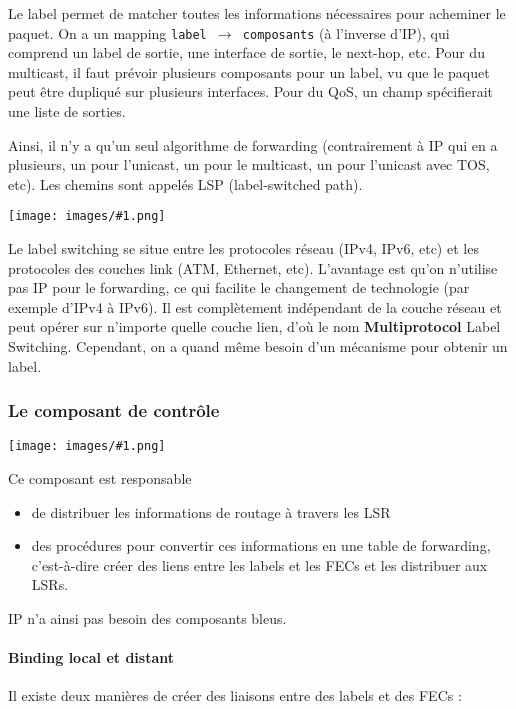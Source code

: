 \documentclass[10pt,a4paper]{report}
\newcommand{\dessinS}[2]{\begin{center}\texttt{[image: images/\#1.png]}\end{center}}
\begin{document}
		Le label permet de matcher toutes les informations nécessaires pour acheminer le paquet. On a un mapping \texttt{label $\rightarrow$ composants} (à l'inverse d'IP), qui comprend un label de sortie, une interface de sortie, le next-hop, etc. Pour du multicast, il faut prévoir plusieurs composants pour un label, vu que le paquet peut être dupliqué sur plusieurs interfaces. Pour du QoS, un champ spécifierait une liste de sorties.
		
		Ainsi, il n'y a qu'un seul algorithme de forwarding (contrairement à IP qui en a plusieurs, un pour l'unicast, un pour le multicast, un pour l'unicast avec TOS, etc). Les chemins sont appelés LSP (label-switched path).
		
		\dessinS{22}{.6}
		
		Le label switching se situe entre les protocoles réseau (IPv4, IPv6, etc) et les protocoles des couches link (ATM, Ethernet, etc). L'avantage est qu'on n'utilise pas IP pour le forwarding, ce qui facilite le changement de technologie (par exemple d'IPv4 à IPv6). Il est complètement indépendant de la couche réseau et peut opérer sur n'importe quelle couche lien, d'où le nom \textbf{Multiprotocol} Label Switching. Cependant, on a quand même besoin d'un mécanisme pour obtenir un label.
		
		
		\subsubsection{Le composant de contrôle}
		
		\dessinS{23}{.9}
		
		Ce composant est responsable
		
		\begin{itemize}
			\item de distribuer les informations de routage à travers les LSR
			\item des procédures pour convertir ces informations en une table de forwarding, c'est-à-dire créer des liens entre les labels et les FECs et les distribuer aux LSRs.
		\end{itemize}
		
		IP n'a ainsi pas besoin des composants bleus.
		
		
		\paragraph{Binding local et distant}
		Il existe deux manières de créer des liaisons entre des labels et des FECs :
		
\end{document}
